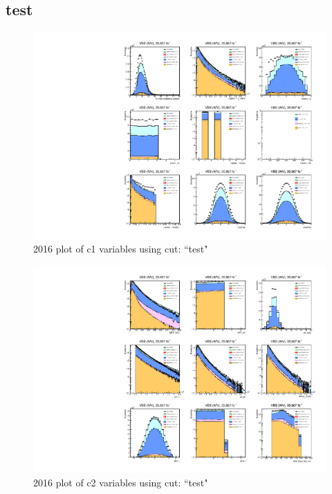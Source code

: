 \documentclass{article}
\begin{document}
      \subsection*{test}
            \begin{figure}[H]
                \centering
                \includegraphics[width=\textwidth]{2016/c1_2016_test.pdf}
                \caption{2016 plot of c1 variables using cut: ``test"}
            \end{figure}
            \begin{figure}[H]
                \centering
                \includegraphics[width=\textwidth]{2016/c2_2016_test.pdf}
                \caption{2016 plot of c2 variables using cut: ``test"}
            \end{figure}
\end{document}
